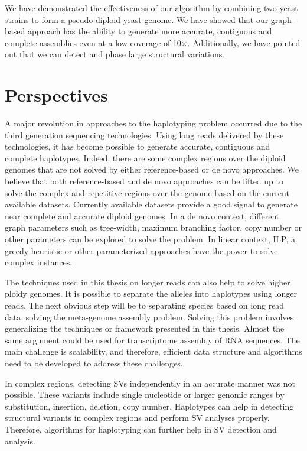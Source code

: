 We have demonstrated the effectiveness of our algorithm by combining two yeast strains to form a pseudo-diploid yeast genome.
We have showed that our graph-based approach has the ability to generate more accurate, contiguous and complete assemblies even at a low coverage of 10$\times$.
Additionally, we have pointed out that we can detect and phase large structural variations.

\section{Perspectives}
A major revolution in approaches to the haplotyping problem occurred due to the third generation sequencing technologies.
Using long reads delivered by these technologies, it has become possible to generate accurate, contiguous and complete haplotypes.
Indeed, there are some complex regions over the diploid genomes that are not solved by either reference-based or de novo approaches.
We believe that both reference-based and de novo approaches can be lifted up to solve the complex and repetitive regions over the genome based on the current available datasets.
Currently available datasets provide a good signal to generate near complete and accurate diploid genomes.
In a de novo context, different graph parameters such as tree-width, maximum branching factor, copy number or other parameters can be explored to solve the problem.
In linear context, ILP, a greedy heuristic or other parameterized approaches have the power to solve complex instances.

The techniques used in this thesis on longer reads can also help to solve higher ploidy genomes. It is possible to separate the alleles into haplotypes using longer reads.
The next obvious step will be to separating species based on long read data, solving the meta-genome assembly problem.
Solving this problem involves generalizing the techniques or framework presented in this thesis.
Almost the same argument could be used for transcriptome
assembly of RNA sequences. The main challenge is scalability, and therefore, efficient data structure and algorithms need to be developed to address these challenges.

In complex regions, detecting SVs independently in an accurate manner was not possible.
These variants include single nucleotide or larger genomic ranges by substitution, insertion, deletion, copy number. 
Haplotypes can help in detecting structural variants in complex regions and perform SV analyses properly.
Therefore, algorithms for haplotyping can further help in SV detection and analysis.

